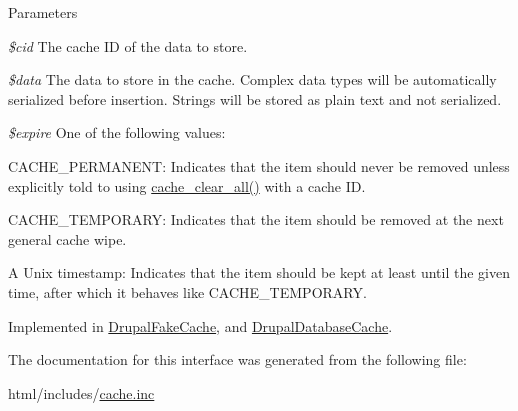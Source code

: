 \begin{DoxyParams}{Parameters}
\item[{\em \$cid}]The cache ID of the data to store. \item[{\em \$data}]The data to store in the cache. Complex data types will be automatically serialized before insertion. Strings will be stored as plain text and not serialized. \item[{\em \$expire}]One of the following values:
\begin{DoxyItemize}
\item CACHE\_\-PERMANENT: Indicates that the item should never be removed unless explicitly told to using \hyperlink{includes_2cache_8inc_a409b34dd629640d791a11736a9de8125}{cache\_\-clear\_\-all()} with a cache ID.
\item CACHE\_\-TEMPORARY: Indicates that the item should be removed at the next general cache wipe.
\item A Unix timestamp: Indicates that the item should be kept at least until the given time, after which it behaves like CACHE\_\-TEMPORARY. 
\end{DoxyItemize}\end{DoxyParams}


Implemented in \hyperlink{classDrupalFakeCache_a54b3264101045168404dc3cedcfce970}{DrupalFakeCache}, and \hyperlink{classDrupalDatabaseCache_a8262bd7a36ca026f6b8c31c30c0f722d}{DrupalDatabaseCache}.

The documentation for this interface was generated from the following file:\begin{DoxyCompactItemize}
\item 
html/includes/\hyperlink{includes_2cache_8inc}{cache.inc}\end{DoxyCompactItemize}
